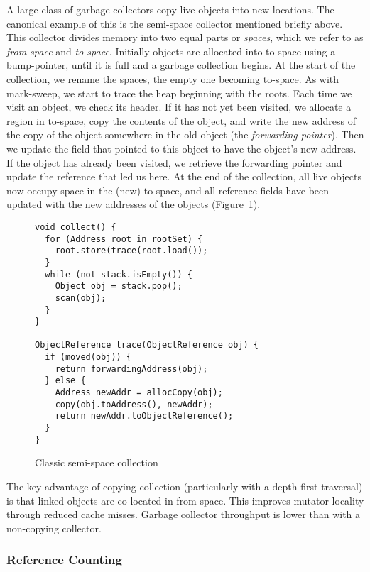 A large class of garbage collectors copy live objects into new locations.  The canonical example
of this is the semi-space collector mentioned briefly above.  This collector divides memory into
two equal parts or \emph{spaces}, which we refer to as \emph{from-space} and \emph{to-space}.  
Initially objects are allocated into to-space using a bump-pointer, until it is full and a 
garbage collection begins.  At the start of the collection, we rename the spaces, the empty one 
becoming to-space.  As with mark-sweep, we start to trace the heap beginning with the roots.  
Each time we visit an object, we check its header.  If it has not yet been visited, we allocate 
a region in to-space, copy the contents of the object, and write the new address of the copy
of the object somewhere in the old object (the \emph{forwarding pointer}).  Then we update the field that pointed to this
object to have the object's new address.  If the object has already been visited, we retrieve
the forwarding pointer and update the reference that led us here.  At the end of the collection, all
live objects now occupy space in the (new) to-space, and all reference fields have been updated
with the new addresses of the objects (Figure~\ref{fig:intro:semi-space}).

\begin{figure}[h!t]
\begin{lstlisting}
void collect() {
  for (Address root in rootSet) {
    root.store(trace(root.load());
  }
  while (not stack.isEmpty()) {
    Object obj = stack.pop();
    scan(obj);
  }
}

ObjectReference trace(ObjectReference obj) {
  if (moved(obj)) {
    return forwardingAddress(obj);
  } else {
    Address newAddr = allocCopy(obj);
    copy(obj.toAddress(), newAddr);
    return newAddr.toObjectReference();
  }
}
\end{lstlisting}
\caption{Classic semi-space collection}
\label{fig:intro:semi-space}
\end{figure}

The key advantage of copying collection (particularly with a depth-first traversal) is
that linked objects are co-located in from-space.  This improves mutator locality through
reduced cache misses.  Garbage collector throughput is lower than with a non-copying collector.


\subsubsection{Reference Counting}

